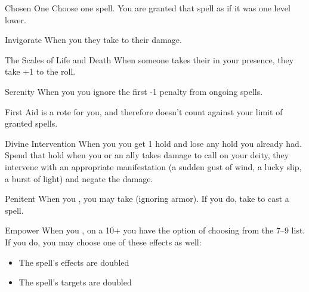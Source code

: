 \documentclass[8pt]{extarticle}
\begin{document}
\begin{multicols}{2}
\firstAdvances

\begin{amove}{Chosen One}
  Choose one spell. You are granted that spell as if it was one level
  lower.
\end{amove}

\begin{amove}{Invigorate}
  When you  they take  to their
  damage.
\end{amove}

\begin{amove}{The Scales of Life and Death}
  When someone takes their  in your presence, they
  take +1 to the roll.
\end{amove}

\begin{amove}{Serenity}
  When you  you ignore the first -1 penalty from
  ongoing spells.
\end{amove}

\begin{amove}{First Aid}
   is a rote for you, and therefore doesn’t
  count against your limit of granted spells.
\end{amove}

\begin{amove}{Divine Intervention}
  When you  you get 1 hold and lose any hold you already
  had. Spend that hold when you or an ally takes damage to call on
  your deity, they intervene with an appropriate manifestation (a
  sudden gust of wind, a lucky slip, a burst of light) and negate the
  damage.
\end{amove}

\begin{amove}{Penitent}
  When you , you may take
   (ignoring armor). If you do, take  to cast
  a spell.
\end{amove}

\begin{amove}{Empower}
  When you , on a 10+ you have the option of
  choosing from the 7–9 list. If you do, you may choose one of these
  effects as well:

  \begin{itemize}
  \item The spell’s effects are doubled
  \item The spell’s targets are doubled
  \end{itemize}
\end{amove}


\end{multicols}
\end{document}
